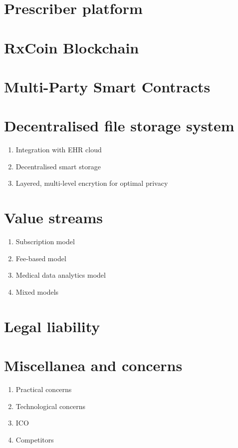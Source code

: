 \documentclass[a4paper,11pt]{article}
\begin{document}
   
\section{Prescriber platform}
    
     

\section{RxCoin Blockchain}
  
  
\section{Multi-Party Smart Contracts}
   \begin{enumerate}
   \end{enumerate}
   

\section{Decentralised file storage system}
   \begin{enumerate}
     \item Integration with EHR cloud
     \item Decentralised smart storage
     \item Layered, multi-level encrytion for optimal privacy
   \end{enumerate}
   
  
\section{Value streams}
   \begin{enumerate}
     \item Subscription model
     \item Fee-based model
     \item Medical data analytics model
     \item Mixed models   
   \end{enumerate}
   

\section{Legal liability}
   \begin{enumerate}
   \end{enumerate}
   
   
\section{Miscellanea and concerns}
   \begin{enumerate}
     \item Practical concerns
     \item Technological concerns
     \item ICO
     \item Competitors
   \end{enumerate}
   
\end{document}
